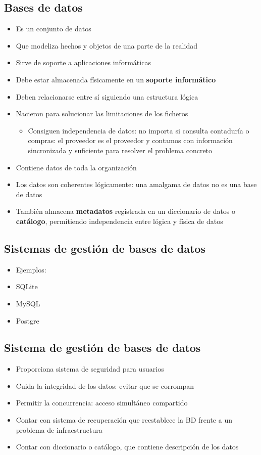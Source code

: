 \subsection{Bases de datos}
\begin{itemize}
    \item Es un conjunto de datos
    \item Que modeliza hechos y objetos de una parte de la realidad
    \item Sirve de soporte a aplicaciones informáticas
    \item Debe estar almacenada físicamente en un \textbf{soporte informático}
    \item Deben relacionarse entre sí siguiendo una estructura lógica
    \item Nacieron para solucionar las limitaciones de los ficheros
          \begin{itemize}
              \item Consiguen independencia de datos: 
              no importa si consulta contaduría o compras:
              el proveedor es el proveedor y contamos con información 
              sincronizada y suficiente para resolver el problema concreto
          \end{itemize}
    \item Contiene datos de toda la organización 
    \item Los datos son coherentes lógicamente: 
    una amalgama de datos no es una base de datos
    \item También almacena \textbf{metadatos} 
    registrada en un diccionario de datos o \textbf{catálogo},
    permitiendo independencia entre lógica y física de datos
\end{itemize}

\subsection{Sistemas de gestión de bases de datos}
\begin{itemize}
    \item Ejemplos:
    \item SQLite
    \item MySQL
    \item Postgre
\end{itemize}

\subsection{Sistema de gestión de bases de datos}
\begin{itemize}
    \item Proporciona sistema de seguridad para usuarios
    \item Cuida la integridad de los datos: evitar que se corrompan
    \item Permitir la concurrencia: acceso simultáneo compartido
    \item Contar con sistema de recuperación que reestablece la BD frente a un problema de infraestructura
    \item Contar con diccionario o catálogo, que contiene descripción de los datos
\end{itemize}

